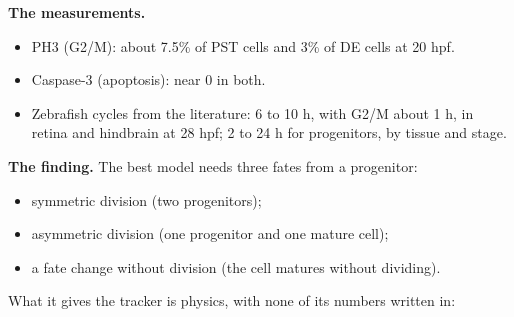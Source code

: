 \textbf{The measurements.}

\begin{itemize}
\item PH3 (G2/M): about 7.5\% of PST cells and 3\% of DE cells at 20 hpf.
\item Caspase-3 (apoptosis): near 0 in both.
\item Zebrafish cycles from the literature: 6 to 10 h, with G2/M about 1 h, in retina and hindbrain at 28 hpf; 2 to 24 h for progenitors, by tissue and stage.
\end{itemize}

\textbf{The finding.} The best model needs three fates from a progenitor:

\begin{itemize}
\item symmetric division (two progenitors);
\item asymmetric division (one progenitor and one mature cell);
\item a fate change without division (the cell matures without dividing).
\end{itemize}

What it gives the tracker is physics, with none of its numbers written in:

